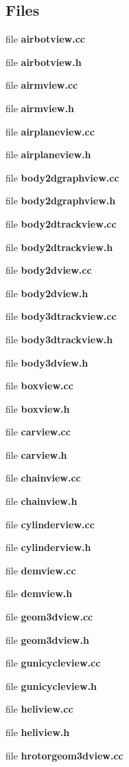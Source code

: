\subsection*{\-Files}
\begin{DoxyCompactItemize}
\item 
file {\bf airbotview.\-cc}
\item 
file {\bf airbotview.\-h}
\item 
file {\bf airmview.\-cc}
\item 
file {\bf airmview.\-h}
\item 
file {\bf airplaneview.\-cc}
\item 
file {\bf airplaneview.\-h}
\item 
file {\bf body2dgraphview.\-cc}
\item 
file {\bf body2dgraphview.\-h}
\item 
file {\bf body2dtrackview.\-cc}
\item 
file {\bf body2dtrackview.\-h}
\item 
file {\bf body2dview.\-cc}
\item 
file {\bf body2dview.\-h}
\item 
file {\bf body3dtrackview.\-cc}
\item 
file {\bf body3dtrackview.\-h}
\item 
file {\bf body3dview.\-h}
\item 
file {\bf boxview.\-cc}
\item 
file {\bf boxview.\-h}
\item 
file {\bf carview.\-cc}
\item 
file {\bf carview.\-h}
\item 
file {\bf chainview.\-cc}
\item 
file {\bf chainview.\-h}
\item 
file {\bf cylinderview.\-cc}
\item 
file {\bf cylinderview.\-h}
\item 
file {\bf demview.\-cc}
\item 
file {\bf demview.\-h}
\item 
file {\bf geom3dview.\-cc}
\item 
file {\bf geom3dview.\-h}
\item 
file {\bf gunicycleview.\-cc}
\item 
file {\bf gunicycleview.\-h}
\item 
file {\bf heliview.\-cc}
\item 
file {\bf heliview.\-h}
\item 
file {\bf hrotorgeom3dview.\-cc}

\end{DoxyCompactItemize}

